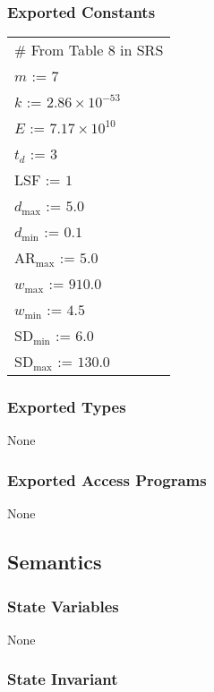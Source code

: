 \documentclass[12pt, titlepage]{article}
\begin{document}
\subsubsection {Exported Constants}

\renewcommand{\arraystretch}{1.2}
\begin{longtable*}[l]{l} 
\# From Table 8 in SRS\\
$m$ := 7\\
$k$ := $2.86\times 10^{-53}$\\
$E$ := $7.17\times 10^{10}$\\
${t_{d}}$ := $3$\\
LSF := $1$\\
${d_{\text{max}}}$ := $5.0$\\
${d_{\text{min}}}$ := $0.1$\\
${\text{AR}_{\text{max}}}$ := $5.0$\\
${w_{\text{max}}}$ := $910.0$\\
${w_{\text{min}}}$ := $4.5$\\
${\text{SD}_{\text{min}}}$ := $6.0$\\
${\text{SD}_{\text{max}}}$ := $130.0$\\
\end{longtable*}

\subsubsection {Exported Types}

None

\subsubsection {Exported Access Programs}

None

\subsection {Semantics}

\subsubsection {State Variables}

None

\subsubsection {State Invariant}
\end{document}
